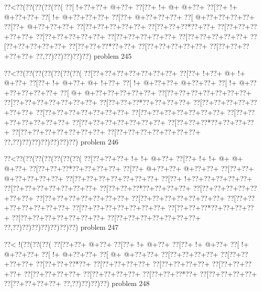 \vbox{\vbox{\goo
\0??<\0??(\0??(\0??(\0??(\0??(
\0??[\- !+\0??+\0??+\- @+\0??+
\0??[\0??+\- !+\- @+\- @+\0??+
\0??[\0??+\- !+\- @+\0??+\0??+
\0??[\- !+\- @+\0??+\0??+\0??+
\0??[\0??+\- @+\0??+\0??+\0??+
\0??[\- @+\0??+\0??+\0??+\0??+
\0??[\0??+\- @+\0??+\0??+\0??+
\0??[\0??+\0??+\0??+\0??+\0??+
\0??[\0??+\0??+\0??*\0??+\0??+
\0??[\0??+\0??+\0??+\0??+\0??+
\0??[\0??+\0??+\0??+\0??+\0??+
\0??[\0??+\0??+\0??+\0??+\0??+
\0??[\0??+\0??+\0??+\0??+\0??+
\0??[\0??+\0??+\0??+\0??+\0??+
\0??[\0??+\0??+\0??*\0??+\0??+
\0??[\0??+\0??+\0??+\0??+\0??+
\0??[\0??+\0??+\0??+\0??+\0??+
\0??,\0??)\0??)\0??)\0??)\0??)
}
\hfil problem 245\hfil\break
}

\vbox{\vbox{\goo
\0??<\0??(\0??(\0??(\0??(\0??(\0??(\0??(
\0??[\0??+\0??+\0??+\0??+\0??+\0??+\0??+
\0??[\0??+\- !+\0??+\- @+\- !+\- @+\0??+
\0??[\0??+\- !+\- @+\0??+\- @+\- !+\0??+
\0??[\- !+\- @+\0??+\0??+\- @+\0??+\0??+
\0??[\- !+\- @+\0??+\0??+\0??+\0??+\0??+
\0??[\- @+\- @+\0??+\0??+\0??+\0??+\0??+
\0??[\0??+\0??+\0??+\0??+\0??+\0??+\0??+
\0??[\0??+\0??+\0??+\0??+\0??+\0??+\0??+
\0??[\0??+\0??+\0??*\0??+\0??+\0??+\0??+
\0??[\0??+\0??+\0??+\0??+\0??+\0??+\0??+
\0??[\0??+\0??+\0??+\0??+\0??+\0??+\0??+
\0??[\0??+\0??+\0??+\0??+\0??+\0??+\0??+
\0??[\0??+\0??+\0??+\0??+\0??+\0??+\0??+
\0??[\0??+\0??+\0??+\0??+\0??+\0??+\0??+
\0??[\0??+\0??+\0??*\0??+\0??+\0??+\0??+
\0??[\0??+\0??+\0??+\0??+\0??+\0??+\0??+
\0??[\0??+\0??+\0??+\0??+\0??+\0??+\0??+
\0??,\0??)\0??)\0??)\0??)\0??)\0??)\0??)
}
\hfil problem 246\hfil\break
}

\vbox{\vbox{\goo
\0??<\0??(\0??(\0??(\0??(\0??(\0??(\0??(
\0??[\0??+\0??+\0??+\- !+\- !+\- @+\0??+
\0??[\0??+\- !+\- !+\- @+\- @+\- @+\0??+
\0??[\0??+\0??+\0??*\0??+\0??+\0??+\0??+
\0??[\0??+\- @+\0??+\0??+\- @+\0??+\0??+
\0??[\0??+\0??+\- @+\0??+\0??+\0??+\0??+
\0??[\0??+\0??+\0??+\0??+\0??+\0??+\0??+
\0??[\0??+\- !+\0??+\0??+\0??+\0??+\0??+
\0??[\0??+\0??+\0??+\0??+\0??+\0??+\0??+
\0??[\0??+\0??+\0??*\0??+\0??+\0??+\0??+
\0??[\0??+\0??+\0??+\0??+\0??+\0??+\0??+
\0??[\0??+\0??+\0??+\0??+\0??+\0??+\0??+
\0??[\0??+\0??+\0??+\0??+\0??+\0??+\0??+
\0??[\0??+\0??+\0??+\0??+\0??+\0??+\0??+
\0??[\0??+\0??+\0??+\0??+\0??+\0??+\0??+
\0??[\0??+\0??+\0??*\0??+\0??+\0??+\0??+
\0??[\0??+\0??+\0??+\0??+\0??+\0??+\0??+
\0??[\0??+\0??+\0??+\0??+\0??+\0??+\0??+
\0??,\0??)\0??)\0??)\0??)\0??)\0??)\0??)
}
\hfil problem 247\hfil\break
}

\vbox{\vbox{\goo
\0??<\- !(\0??(\0??(\0??(
\0??[\0??+\0??+\- @+\0??+
\0??[\0??+\- !+\- @+\0??+
\0??[\0??+\- !+\- @+\0??+
\0??[\- !+\- @+\0??+\0??+
\0??[\- !+\- @+\0??+\0??+
\0??[\- @+\- @+\0??+\0??+
\0??[\0??+\0??+\0??+\0??+
\0??[\0??+\0??+\0??+\0??+
\0??[\0??+\0??+\0??*\0??+
\0??[\0??+\0??+\0??+\0??+
\0??[\0??+\0??+\0??+\0??+
\0??[\0??+\0??+\0??+\0??+
\0??[\0??+\0??+\0??+\0??+
\0??[\0??+\0??+\0??+\0??+
\0??[\0??+\0??+\0??*\0??+
\0??[\0??+\0??+\0??+\0??+
\0??[\0??+\0??+\0??+\0??+
\0??,\0??)\0??)\0??)\0??)
}
\hfil problem 248\hfil\break
}

